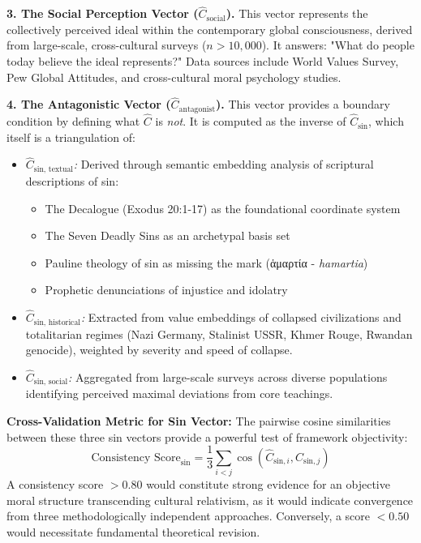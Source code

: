 \documentclass[11pt,a4paper]{article}
\theoremstyle{definition}
\theoremstyle{remark}
\begin{document}
\begin{small}
\textbf{3. The Social Perception Vector (\(\hat{C}_{\text{social}}\)).} This vector represents the collectively perceived ideal within the contemporary global consciousness, derived from large-scale, cross-cultural surveys (\(n > 10,000\)). It answers: "What do people today believe the ideal represents?" Data sources include World Values Survey, Pew Global Attitudes, and cross-cultural moral psychology studies.

\textbf{4. The Antagonistic Vector (\(\hat{C}_{\text{antagonist}}\)).} This vector provides a boundary condition by defining what \(\hat{C}\) is \textit{not}. It is computed as the inverse of \(\hat{C}_{\text{sin}}\), which itself is a triangulation of:
\begin{itemize}
    \item \textit{\(\hat{C}_{\text{sin, textual}}\):} Derived through semantic embedding analysis of scriptural descriptions of sin:
        \begin{itemize}
            \item The Decalogue (Exodus 20:1-17) as the foundational coordinate system
            \item The Seven Deadly Sins as an archetypal basis set
            \item Pauline theology of sin as missing the mark (ἁμαρτία - \textit{hamartia})
            \item Prophetic denunciations of injustice and idolatry
        \end{itemize}
    \item \textit{\(\hat{C}_{\text{sin, historical}}\):} Extracted from value embeddings of collapsed civilizations and totalitarian regimes (Nazi Germany, Stalinist USSR, Khmer Rouge, Rwandan genocide), weighted by severity and speed of collapse.
    \item \textit{\(\hat{C}_{\text{sin, social}}\):} Aggregated from large-scale surveys across diverse populations identifying perceived maximal deviations from core teachings.
\end{itemize}

\textbf{Cross-Validation Metric for Sin Vector:} The pairwise cosine similarities between these three sin vectors provide a powerful test of framework objectivity:
\begin{equation}
\text{Consistency Score}_{\text{sin}} = \frac{1}{3}\sum_{i<j} \cos(\hat{C}_{\text{sin}, i}, \hat{C}_{\text{sin}, j})
\end{equation}
A consistency score \(> 0.80\) would constitute strong evidence for an objective moral structure transcending cultural relativism, as it would indicate convergence from three methodologically independent approaches. Conversely, a score \(< 0.50\) would necessitate fundamental theoretical revision.


\end{small}
\end{document}
